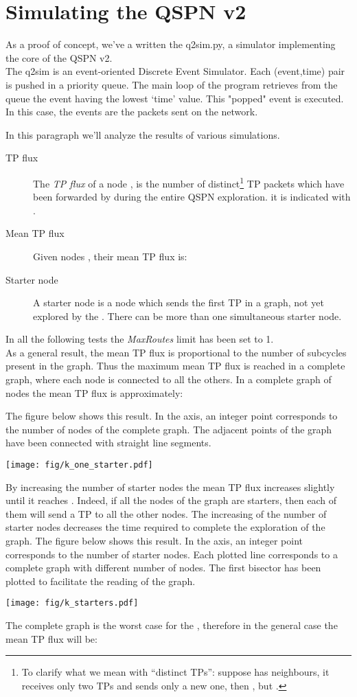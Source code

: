 \documentclass[a4paper]{article}
\begin{document}
\section{Simulating the QSPN v2}
As a proof of concept, we've a written the q2sim.py\cite{q2sim}, a simulator
implementing the core of the QSPN v2.\\
The q2sim is  an event-oriented Discrete Event Simulator.
Each (event,time) pair is pushed in a priority queue.
The main loop of the program retrieves from the queue the event having the
lowest `time' value. This "popped" event is executed. In this case, the
events are the packets sent on the network.

In this paragraph we'll analyze the results of various simulations.
\begin{description}
	\item[TP flux] The \emph{TP flux} of a node , is the number of
		distinct\footnote{To clarify what we mean with ``distinct
		TPs'': suppose  has  neighbours, it receives only two
		TPs and sends only a new one, then , but
		.}
		TP packets which have been forwarded by  during the entire QSPN
		exploration. it is indicated with .
	\item[Mean TP flux] Given  nodes , their mean TP
		flux is:
		
	\item[Starter node]
		A starter node is a node which sends the first TP in a graph,
		not yet explored by the . There can be more than one
		simultaneous starter node.
\end{description}
In all the following tests the \emph{MaxRoutes} limit has been set to 1.\\

As a general result, the mean TP flux is proportional to the number of
subcycles present in the graph. Thus the maximum mean TP flux is reached in a
complete graph, where each node is connected to all the others. In a complete
graph of  nodes the mean TP flux is approximately:

The figure below shows this result. In the  axis, an integer point
corresponds to the number of nodes of the complete graph. The adjacent points of the
graph have been connected  with straight line segments.
\begin{center}
\label{fig:k_one_starter}
\texttt{[image: fig/k\_one\_starter.pdf]}
\end{center}
By increasing the number of starter nodes the
mean TP flux increases slightly until it reaches . Indeed, if all the
nodes of the graph are starters, then each of them will send a TP to all the
other nodes. The increasing of the number of starter nodes decreases the time required
to complete the exploration of the graph.
The figure below shows this result. In the  axis, an integer point
corresponds to the number of starter nodes. Each plotted line corresponds to a
complete graph with different number of nodes. The first bisector has been
plotted to facilitate the reading of the graph.
\begin{center}
\label{fig:k_starters}
\texttt{[image: fig/k\_starters.pdf]}
\end{center}
The complete graph is the worst case for the , therefore in the general case the mean TP flux will be:
\end{document}
